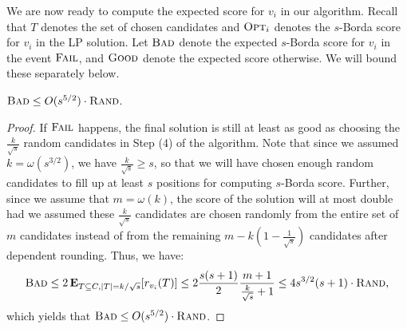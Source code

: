 We are now ready to compute the expected score for $v_i$ in our algorithm. Recall that $T$ denotes the set of chosen candidates and ${\normalfont\textsc{Opt}}_i$ denotes the $s$-Borda score for $v_i$ in the LP solution. Let ${\normalfont\textsc{Bad}}$ denote the expected $s$-Borda score for $v_i$ in the event ${\normalfont\textsc{Fail}}$, and ${\normalfont\textsc{Good}}$ denote the expected score otherwise. We will bound these separately below.

\begin{lemma}
\label{lem:bad}
${\normalfont\textsc{Bad}} \le O(s^{5/2})\cdot {\normalfont\textsc{Rand}}$.
\end{lemma}
\begin{proof}
If ${\normalfont\textsc{Fail}}$ happens, the final solution is still at least as good as choosing the $\frac{k}{\sqrt{s}}$ random candidates in Step (4) of the algorithm. Note that since we assumed $k = \omega(s^{3/2})$, we have $\frac{k}{\sqrt{s}} \ge s$, so that we will have chosen enough random candidates to fill up at least $s$ positions for computing $s$-Borda score. Further, since we assume that $m =  \omega(k)$, the score of the solution will at most double had we assumed these $\frac{k}{\sqrt{s}}$ candidates are chosen randomly from the entire set of $m$ candidates instead of from the remaining $m - k(1 - \frac{1}{\sqrt{s}})$ candidates after dependent rounding. Thus, we have:
$${\normalfont\textsc{Bad}} \leq 2 \operatorname{\mathbf{E}}_{T \subseteq C, |T| = k/\sqrt{s}}[r_{v_i}(T)] \le 2 \frac{s(s+1)}{2} \frac{m+1}{\frac{k}{\sqrt{s}} + 1}\leq 4s^{3/2}(s + 1)\cdot {\normalfont\textsc{Rand}},$$
which yields that ${\normalfont\textsc{Bad}} \leq O(s^{5/2})\cdot {\normalfont\textsc{Rand}}$.
\end{proof}

